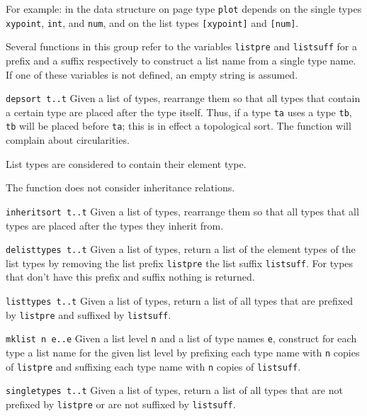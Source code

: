 For example:
in the data structure on page \pageref{plotds} type \texttt{plot}
depends on the single types \texttt{xypoint}, \texttt{int}, and \texttt{num},
and on the list types \texttt{[xypoint]} and \texttt{[num]}.

Several functions in this group refer to the {\Tm} variables \verb+listpre+
and \verb+listsuff+ for a prefix and a suffix respectively to construct
a list name from a single type name.
If one of these variables is not defined, an empty string is assumed.

\begin{desctab}
\item[\texttt{depsort t..t}]
Given a list of types, rearrange them so that all types that contain
a certain type are placed after the type itself.  Thus, if a type
\texttt{ta} uses a type \texttt{tb}, \texttt{tb} will be placed
before \texttt{ta}; this is in effect a topological sort.  The
function will complain about circularities.

List types are considered to contain their element type.

The function does not consider inheritance relations.

\item[\texttt{inheritsort t..t}]
Given a list of types, rearrange them so that all types that all
types are placed after the types they inherit from.

\item[\texttt{delisttypes t..t}]
Given a list of types, return a list of the element types of the list types
by removing the list prefix \texttt{listpre} the list suffix \texttt{listsuff}.
For types that don't have this prefix and suffix nothing is returned.

\item[\texttt{listtypes t..t}]
Given a list of types, return a list of all types that are prefixed
by \texttt{listpre} and suffixed by \texttt{listsuff}.

\item[\texttt{mklist n e..e}]
Given a list level \texttt{n} and a list of type names \texttt{e}, construct
for each type a list name for the given list level by prefixing each
type name with \texttt{n} copies of \verb+listpre+ and suffixing each type
name with \texttt{n} copies of \verb+listsuff+.

\item[\texttt{singletypes t..t}]
Given a list of types, return a list of all types that are not prefixed
by \texttt{listpre} or are not suffixed by \texttt{listsuff}.


\end{desctab}
